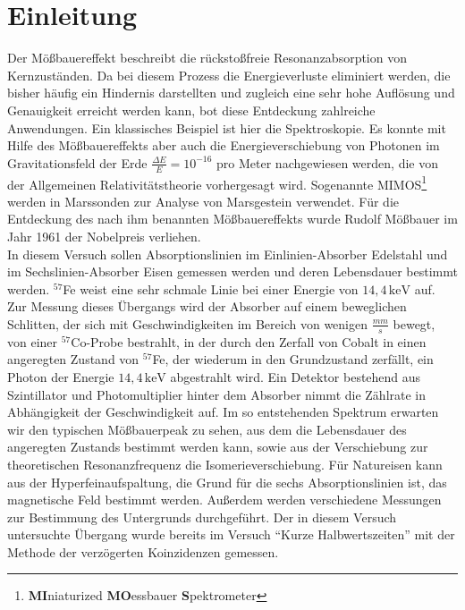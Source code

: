 \section{Einleitung}
	
Der Mößbauereffekt beschreibt die rückstoßfreie Resonanzabsorption von Kernzuständen. Da bei diesem Prozess die Energieverluste eliminiert werden, die bisher häufig ein Hindernis darstellten und zugleich eine sehr hohe Auflösung und Genauigkeit erreicht werden kann, bot diese Entdeckung zahlreiche Anwendungen. Ein klassisches Beispiel ist hier die Spektroskopie. Es konnte mit Hilfe des Mößbauereffekts aber auch die Energieverschiebung von Photonen im Gravitationsfeld der Erde $\frac{\Delta E }{E} = 10^{-16} $ pro Meter nachgewiesen werden, die von der Allgemeinen Relativitätstheorie vorhergesagt wird. Sogenannte MIMOS\footnote{\textbf{MI}niaturized \textbf{MO}essbauer \textbf Spektrometer} werden in Marssonden zur Analyse von Marsgestein verwendet.
Für die Entdeckung des nach ihm benannten Mößbauereffekts wurde Rudolf Mößbauer im Jahr 1961 der Nobelpreis verliehen.\\

In diesem Versuch sollen Absorptionslinien im Einlinien-Absorber Edelstahl und im Sechslinien-Absorber Eisen gemessen werden und deren Lebensdauer bestimmt werden. $^{57}$Fe weist eine sehr schmale Linie bei einer Energie von $14,4\,\mathrm{keV}$ auf.
Zur Messung dieses Übergangs wird der Absorber auf einem beweglichen Schlitten, der sich mit Geschwindigkeiten im Bereich von wenigen $\si{\frac{mm}{s}}$ bewegt, von einer $^{57}$Co-Probe bestrahlt, in der durch den Zerfall von Cobalt in einen angeregten Zustand von $^{57}$Fe, der wiederum in den Grundzustand zerfällt, ein Photon der Energie $14,4\,\mathrm{keV}$ abgestrahlt wird. Ein Detektor bestehend aus Szintillator und Photomultiplier hinter dem Absorber nimmt die Zählrate in Abhängigkeit der Geschwindigkeit auf. Im so entstehenden Spektrum erwarten wir den typischen Mößbauerpeak zu sehen, aus dem die Lebensdauer des angeregten Zustands bestimmt werden kann, sowie aus der Verschiebung zur theoretischen Resonanzfrequenz die Isomerieverschiebung. Für Natureisen kann aus der Hyperfeinaufspaltung, die Grund für die sechs Absorptionslinien ist, das magnetische Feld bestimmt werden. Außerdem werden verschiedene Messungen zur Bestimmung des Untergrunds durchgeführt.
Der in diesem Versuch untersuchte Übergang wurde bereits im Versuch "`Kurze Halbwertszeiten"' mit der Methode der verzögerten Koinzidenzen gemessen. 


